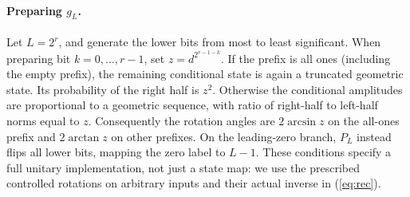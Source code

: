 \documentclass[11pt]{article}
\begin{document}
\paragraph{Preparing $g_L$.} Let $L=2^r$, and generate the lower bits from most to least significant. When preparing bit $k=0,\ldots,r-1$, set $z=d^{2^{r-1-k}}$. If the prefix is all ones (including the empty prefix), the remaining conditional state is again a truncated geometric state. Its probability of the right half is $z^2$. Otherwise the conditional amplitudes are proportional to a geometric sequence, with ratio of right-half to left-half norms equal to $z$. Consequently the rotation angles are $2\arcsin z$ on the all-ones prefix and $2\arctan z$ on other prefixes. On the leading-zero branch, $P_L$ instead flips all lower bits, mapping the zero label to $L-1$. These conditions specify a full unitary implementation, not just a state map: we use the prescribed controlled rotations on arbitrary inputs and their actual inverse in (\ref{eq:rec}).
\end{document}
